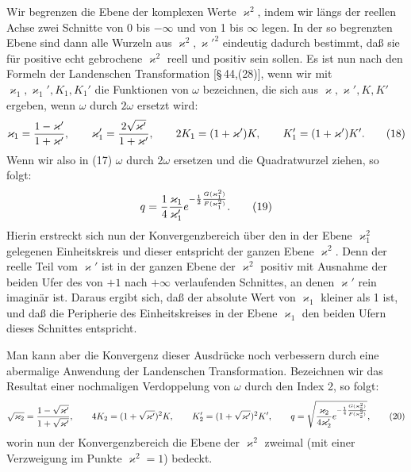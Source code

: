\documentclass[11pt]{article}
\begin{document}
Wir begrenzen die Ebene der komplexen Werte $\varkappa^2$, indem wir längs der reellen Achse zwei Schnitte von 0 bis $-\infty$ und von 1 bis $\infty$ legen. In der so begrenzten Ebene sind dann alle Wurzeln aus $\varkappa^2,\varkappa'^2$ eindeutig dadurch bestimmt, daß sie für positive echt gebrochene $\varkappa^2$ reell und positiv sein sollen. Es ist nun nach den Formeln der Landenschen Transformation [\S\,44,(28)], wenn wir mit $\varkappa_1,\varkappa_1',K_1,K_1'$ die Funktionen von $\omega$ bezeichnen, die sich aus $\varkappa,\varkappa',K,K'$ ergeben, wenn $\omega$ durch $2\omega$ ersetzt wird:
\begin{equation}
\varkappa_1={1-\varkappa'\over1+\varkappa'},
\qquad
\varkappa_1'={2\sqrt{\varkappa'}\over1+\varkappa'},
\qquad
2K_1=(1+\varkappa')K,
\qquad
K_1'=(1+\varkappa')K'.
\tag{18}
\end{equation}
Wenn wir also in (17) $\omega$ durch $2\omega$ ersetzen und die Quadratwurzel ziehen, so folgt:
\begin{equation}
q={1\over4}{\varkappa_1\over\varkappa_1'}
 e^{-{1\over2}{G(\varkappa_1^2)\over F(\varkappa_1^2)}}.
\tag{19}
\end{equation}
Hierin erstreckt sich nun der Konvergenzbereich über den in der Ebene $\varkappa_1^2$ gelegenen Einheitskreis und dieser entspricht der ganzen Ebene $\varkappa^2$. Denn der reelle Teil vom $\varkappa'$ ist in der ganzen Ebene der $\varkappa^2$ positiv mit Ausnahme der beiden Ufer des von $+1$ nach $+\infty$ verlaufenden Schnittes, an denen $\varkappa'$ rein imaginär ist. Daraus ergibt sich, daß der absolute Wert von $\varkappa_1$ kleiner als 1 ist, und daß die Peripherie des Einheitskreises in der Ebene $\varkappa_1$ den beiden Ufern dieses Schnittes entspricht.

Man kann aber die Konvergenz dieser Ausdrücke noch verbessern durch eine abermalige Anwendung der Landenschen Transformation. Bezeichnen wir das Resultat einer nochmaligen Verdoppelung von $\omega$ durch den Index 2, so folgt:
\begin{equation}
\sqrt{\varkappa_2}={1-\sqrt{\varkappa'}\over1+\sqrt{\varkappa'}},
\qquad
4K_2=(1+\sqrt{\varkappa'})^2K,
\qquad
K_2'=(1+\sqrt{\varkappa'})^2K',
\qquad
q=\sqrt{{\varkappa_2\over4\varkappa_2'}e^{-{1\over4}{G(\varkappa_2^2)\over F(\varkappa_2^2)}}},
\tag{20}
\end{equation}
worin nun der Konvergenzbereich die Ebene der $\varkappa^2$ zweimal (mit einer Verzweigung im Punkte $\varkappa^2=1$) bedeckt.
\end{document}
